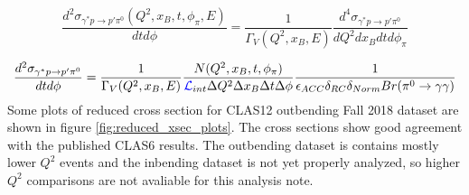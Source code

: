  \begin{equation}\label{xsec_red}
    \frac{d^2\sigma_{\gamma^*p \rightarrow p'\pi^0}(Q^2,x_B,t,\phi_{\pi},E)}{dtd\phi} = \frac{1}{\Gamma_V(Q^2,x_B,E)} \frac{d^4\sigma_{\gamma^*p \rightarrow p'\pi^0}}{dQ^2dx_Bdtd\phi_{\pi}}
\end{equation}


 \begin{equation}\label{xsec_red_full}
    \frac{d^2\sigma_{\gamma^*p \rightarrow p'\pi^0}}{dtd\phi} = \frac{1}{\Gamma_V(Q^2,x_B,E)} \frac{N(Q^2,x_B,t,\phi_{\pi})}{\textcolor{blue}{ \mathcal{L}}_{int}\Delta Q^2\Delta x_B\Delta t\Delta \phi} \frac{1}{\epsilon_{ACC} \delta_{RC} \delta_{Norm} Br(\pi^0 \rightarrow \gamma \gamma)}
\end{equation}
Some plots of reduced cross section for CLAS12 outbending Fall 2018 dataset are shown in figure \ref{fig:reduced_xsec_plots}. The cross sections show good agreement with the published CLAS6 results. The outbending dataset is contains mostly lower $Q^2$ events and the inbending dataset is not yet properly analyzed, so higher $Q^2$ comparisons are not avaliable for this analysis note. 


